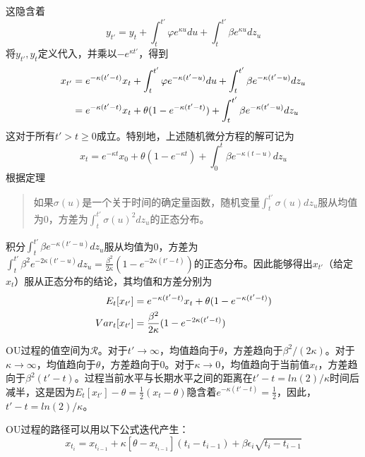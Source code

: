 \documentclass[UTF8]{ctexart}
\begin{document}
这隐含着
$$y_{t'}=y_t+\int_t^{t'}\varphi e^{\kappa u}du +\int_t^{t'}\beta e^{\kappa u}dz_u$$
将$y_{t'},y_t$定义代入，并乘以$-e^{\kappa t'}$，得到
\begin{align}	
x_{t'}
&=e^{-\kappa (t'-t)}x_t+\int_t^{t'}\varphi e^{-\kappa (t'-u)}du+\int_t^{t'}\beta e^{-\kappa (t'-u)}dz_u
 \notag \\
&=e^{-\kappa (t'-t)}x_t+\theta(1-e^{-\kappa (t'-t)})+\int_t^{t'}\beta e^{-\kappa (t'-u)}dz_u
\notag
\end{align}
这对于所有$t' > t \geqslant 0$成立。特别地，上述随机微分方程的解可记为
$$x_t=e^{-\kappa t}x_0+\theta(1-e^{-\kappa t})+\int_0^t \beta e^{-\kappa (t-u)}dz_u$$
根据定理
\begin{quote}
\kaishu
如果$\sigma(u)$是一个关于时间的确定量函数，随机变量$\int_t^{t'}\sigma(u) dz_u$服从均值为0，方差为$\int_t^{t'}\sigma(u)^2 dz_u$的正态分布。
\end{quote}
积分$\int_t^{t'}\beta e^{-\kappa (t'-u)}dz_u$服从均值为0，方差为$\int_t^{t'}\beta^2 e^{-2\kappa (t'-u)}dz_u=\frac{\beta^2}{2 \kappa}(1-e^{-2 \kappa(t'-t)})$的正态分布。因此能够得出$x_{t'}$（给定$x_t$）服从正态分布的结论，其均值和方差分别为
\begin{align}
E_t[x_{t'}] &= e^{-\kappa (t'-t)}x_t+\theta(1-e^{-\kappa (t'-t)}) \notag \\
Var_t[x_{t'}] &=\frac{\beta^2}{2 \kappa}(1-e^{-2 \kappa(t'-t)}) \notag
\end{align}

OU过程的值空间为$\mathscr{R}$。对于$t' \rightarrow \infty$，均值趋向于$\theta$，方差趋向于$\beta^2/(2\kappa)$。对于$\kappa \rightarrow \infty$，均值趋向于$\theta$，方差趋向于0。对于$\kappa \rightarrow 0$，均值趋向于当前值$x_t$，方差趋向于$\beta^2(t'-t)$。过程当前水平与长期水平之间的距离在$t'-t=ln(2)/\kappa$时间后减半，这是因为$E_t[x_{t'}]-\theta=\frac{1}{2}(x_t-\theta)$隐含着$e^{-\kappa(t'-t)}=\frac{1}{2}$，因此，$t'-t=ln(2)/\kappa$。

OU过程的路径可以用以下公式迭代产生：
$$x_{t_i}=x_{t_{i-1}}+\kappa[\theta-x_{t_{i-1}}](t_i-t_{i-1})+\beta \epsilon_i \sqrt{t_i-t_{i-1}}$$
\end{document}
